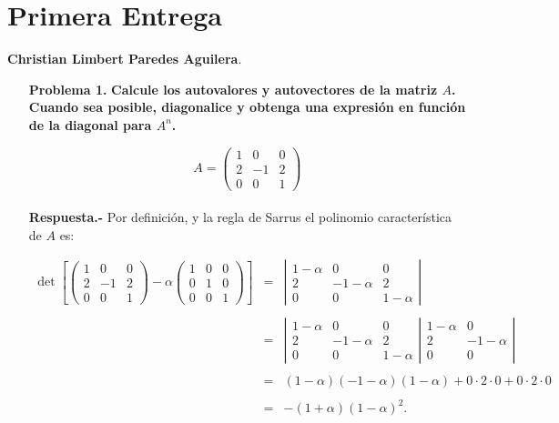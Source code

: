 \section*{\center \large Primera Entrega}
\begin{center}
    \textbf{Christian Limbert Paredes Aguilera}.
\end{center}
\vspace{1cm}

\begin{enumerate}

    \item[\bfseries Problema 1.] \textbf{\boldmath Calcule los autovalores y autovectores de la matriz $A$. Cuando sea posible, diagonalice y obtenga una expresión en función de la diagonal para $A^n$.}

    $$A=\left(\begin{array}{*{3}{r}}
	1 & 0 & 0 \\
	2 & -1 & 2 \\
	0 & 0 & 1 
    \end{array}\right)$$\\

    \textbf{Respuesta.-}\;  Por definición, y la regla de Sarrus el polinomio característica de $A$ es:
    
    $$ \begin{array}{rcl} 
	\det \left[
    \left(\begin{array}{*{3}{r}}
	1 & 0 & 0 \\
	2 & -1 & 2 \\
	0 & 0 & 1 
    \end{array}\right) - \alpha 
    \left(\begin{array}{*{3}{r}}
	1 & 0 & 0 \\
	0 & 1 & 0 \\
	0 & 0 & 1
\end{array}\right)\right] & = & 
    \left|\begin{array}{*{3}{c}}
	1-\alpha & 0 & 0 \\
	2 & -1-\alpha & 2 \\
	0 & 0 & 1-\alpha
	\end{array}\right| \\\\ 
	&=&  
	\left|\begin{array}{*{3}{c}}
	1-\alpha & 0 & 0 \\
	2 & -1-\alpha & 2 \\
	0 & 0 & 1-\alpha
	\end{array}\right|
	\left.\begin{array}{*{3}{c}}
	1-\alpha & 0  \\
	2 & -1-\alpha  \\
	0 & 0
	\end{array}\right|\\\\
	&=&(1-\alpha)(-1-\alpha)(1-\alpha)+0\cdot 2 \cdot 0 + 0\cdot 2 \cdot 0\\\\
	&=&-(1+\alpha)\left(1-\alpha\right)^2.
    \end{array}$$


\end{enumerate}
